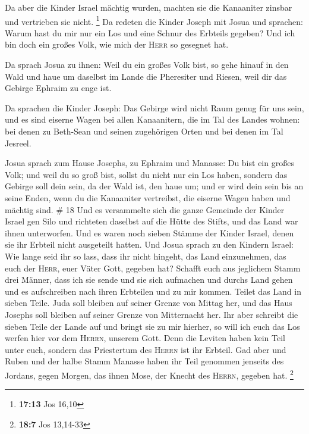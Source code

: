  Da aber die Kinder Israel mächtig wurden, machten sie
die Kanaaniter zinsbar und vertrieben sie nicht. \footnote{\textbf{17:13}
  Jos 16,10}  Da redeten die Kinder Joseph mit Josua und
sprachen: Warum hast du mir nur ein Los und eine Schnur des Erbteils
gegeben? Und ich bin doch ein großes Volk, wie mich der \textsc{Herr} so
gesegnet hat.

 Da sprach Josua zu ihnen: Weil du ein großes Volk bist,
so gehe hinauf in den Wald und haue um daselbst im Lande die Pheresiter
und Riesen, weil dir das Gebirge Ephraim zu enge ist.

 Da sprachen die Kinder Joseph: Das Gebirge wird nicht
Raum genug für uns sein, und es sind eiserne Wagen bei allen
Kanaanitern, die im Tal des Landes wohnen: bei denen zu Beth-Sean und
seinen zugehörigen Orten und bei denen im Tal Jesreel.

 Josua sprach zum Hause Josephs, zu Ephraim und Manasse:
Du bist ein großes Volk; und weil du so groß bist, sollst du nicht nur
ein Los haben,  sondern das Gebirge soll dein sein, da
der Wald ist, den haue um; und er wird dein sein bis an seine Enden,
wenn du die Kanaaniter vertreibst, die eiserne Wagen haben und mächtig
sind. \# 18  Und es versammelte sich die ganze Gemeinde
der Kinder Israel gen Silo und richteten daselbst auf die Hütte des
Stifts, und das Land war ihnen unterworfen.  Und es waren
noch sieben Stämme der Kinder Israel, denen sie ihr Erbteil nicht
ausgeteilt hatten.  Und Josua sprach zu den Kindern
Israel: Wie lange seid ihr so lass, dass ihr nicht hingeht, das Land
einzunehmen, das euch der \textsc{Herr}, euer Väter Gott, gegeben hat?
 Schafft euch aus jeglichem Stamm drei Männer, dass ich
sie sende und sie sich aufmachen und durchs Land gehen und es
aufschreiben nach ihren Erbteilen und zu mir kommen. 
Teilet das Land in sieben Teile. Juda soll bleiben auf seiner Grenze von
Mittag her, und das Haus Josephs soll bleiben auf seiner Grenze von
Mitternacht her.  Ihr aber schreibt die sieben Teile der
Lande auf und bringt sie zu mir hierher, so will ich euch das Los werfen
hier vor dem \textsc{Herrn}, unserem Gott.  Denn die
Leviten haben kein Teil unter euch, sondern das Priestertum des
\textsc{Herrn} ist ihr Erbteil. Gad aber und Ruben und der halbe Stamm
Manasse haben ihr Teil genommen jenseits des Jordans, gegen Morgen, das
ihnen Mose, der Knecht des \textsc{Herrn}, gegeben hat. \footnote{\textbf{18:7}
  Jos 13,14-33}

